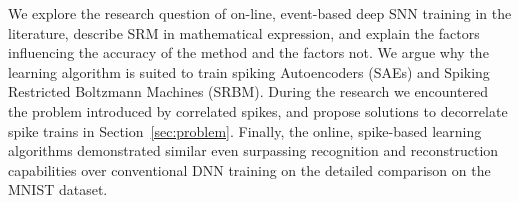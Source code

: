 We explore the research question of on-line, event-based deep SNN training in the literature, describe SRM in mathematical expression, and explain the factors influencing the accuracy of the method and the factors not. 
We argue why the learning algorithm is suited to train spiking Autoencoders (SAEs) and Spiking Restricted Boltzmann Machines (SRBM).
During the research we encountered the problem introduced by correlated spikes, and propose solutions to decorrelate spike trains in Section~\ref{sec:problem}. 
Finally, the online, spike-based learning algorithms demonstrated similar even surpassing recognition and reconstruction capabilities over conventional DNN training on the detailed comparison on the MNIST dataset.




